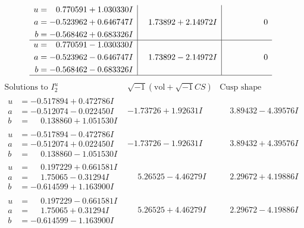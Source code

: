 \documentclass[1p]{elsarticle_modified}
\theoremstyle{definition}
\newcommand{\I}{\sqrt{-1}}
\begin{document}
$$\begin{array}{c|c|c}
\begin{aligned}
u &= \phantom{-}0.770591 + 1.030330 I \\
a &= -0.523962 + 0.646747 I \\
b &= -0.568462 + 0.683326 I\end{aligned}
 & \phantom{-}1.73892 + 2.14972 I & \phantom{-0.000000 } 0 \\ \hline\begin{aligned}
u &= \phantom{-}0.770591 - 1.030330 I \\
a &= -0.523962 - 0.646747 I \\
b &= -0.568462 - 0.683326 I\end{aligned}
 & \phantom{-}1.73892 - 2.14972 I & \phantom{-0.000000 } 0\\
 \hline 
 \end{array}$$\newpage$$\begin{array}{c|c|c}  
\text{Solutions to }I^u_{2}& \I (\text{vol} + \sqrt{-1}CS) & \text{Cusp shape}\\
 \hline 
\begin{aligned}
u &= -0.517894 + 0.472786 I \\
a &= -0.512074 - 0.022450 I \\
b &= \phantom{-}0.138860 + 1.051530 I\end{aligned}
 & -1.73726 + 1.92631 I & \phantom{-}3.89432 - 4.39576 I \\ \hline\begin{aligned}
u &= -0.517894 - 0.472786 I \\
a &= -0.512074 + 0.022450 I \\
b &= \phantom{-}0.138860 - 1.051530 I\end{aligned}
 & -1.73726 - 1.92631 I & \phantom{-}3.89432 + 4.39576 I \\ \hline\begin{aligned}
u &= \phantom{-}0.197229 + 0.661581 I \\
a &= \phantom{-}1.75065 - 0.31294 I \\
b &= -0.614599 + 1.163900 I\end{aligned}
 & \phantom{-}5.26525 - 4.46279 I & \phantom{-}2.29672 + 4.19886 I \\ \hline\begin{aligned}
u &= \phantom{-}0.197229 - 0.661581 I \\
a &= \phantom{-}1.75065 + 0.31294 I \\
b &= -0.614599 - 1.163900 I\end{aligned}
 & \phantom{-}5.26525 + 4.46279 I & \phantom{-}2.29672 - 4.19886 I \\ \hline\begin{aligned}

\end{aligned}
\end{array}$$
\end{document}
